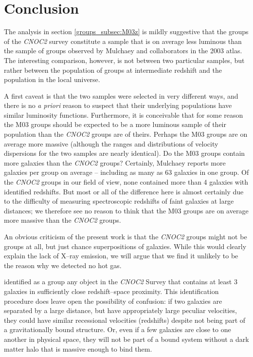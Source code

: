 \section{Conclusion}
\label{groups_sec:conc}
The analysis in section \ref{groups_subsec:M03z} is mildly suggestive
that the groups of the \textsl{CNOC2} survey constitute a sample that
is on average less luminous than the sample of groups observed by
Mulchaey and collaborators in the 2003 atlas.  The interesting
comparison, however, is not between two particular samples, but rather
between the population of groups at intermediate redshift and the
population in the local universe.

A first caveat is that the two samples were selected in very different
ways, and there is no {\it a priori} reason to suspect that their
underlying populations have similar luminosity functions.
Furthermore, it is conceivable that for some reason the M03 groups
should be expected to be a more luminous sample of their population
than the \textsl{CNOC2} groups are of theirs.  Perhaps the M03 groups
are on average more massive (although the ranges and distributions of
velocity dispersions for the two samples are nearly identical).  Do
the M03 groups contain more galaxies than the \textsl{CNOC2} groups?
Certainly, Mulchaey reports more galaxies per group on average --
including as many as 63 galaxies in one group.  Of the \textsl{CNOC2}
groups in our field of view, none contained more than 4 galaxies with
identified redshifts.  But most or all of the difference here is
almost certainly due to the difficulty of measuring spectroscopic
redshifts of faint galaxies at large distances; we therefore see no
reason to think that the M03 groups are on average more massive than
the \textsl{CNOC2} groups.

An obvious criticism of the present work is that the \textsl{CNOC2}
groups might not be groups at all, but just chance superpositions of
galaxies.  While this would clearly explain the lack of X--ray
emission, we will argue that we find it unlikely to be the reason why
we detected no hot gas.

\citet{carlberg2001gg} identified as a group any object in the
\textsl{CNOC2} Survey that contains at least 3 galaxies in
sufficiently close redshift--space proximity.  This identification
procedure does leave open the possibility of confusion: if two
galaxies are separated by a large distance, but have appropriately
large peculiar velocities, they could have similar recessional
velocities (redshifts) despite not being part of a gravitationally
bound structure.  Or, even if a few galaxies are close to one another
in physical space, they will not be part of a bound system without a
dark matter halo that is massive enough to bind them.

